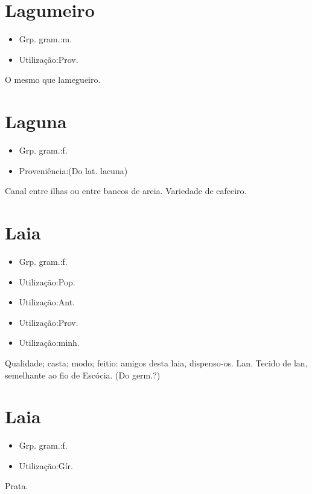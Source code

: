 \section{Lagumeiro}
\begin{itemize}
\item {Grp. gram.:m.}
\end{itemize}
\begin{itemize}
\item {Utilização:Prov.}
\end{itemize}
O mesmo que \textunderscore lamegueiro\textunderscore .
\section{Laguna}
\begin{itemize}
\item {Grp. gram.:f.}
\end{itemize}
\begin{itemize}
\item {Proveniência:(Do lat. \textunderscore lacuna\textunderscore )}
\end{itemize}
Canal entre ilhas ou entre bancos de areia.
Variedade de cafeeiro.
\section{Laia}
\begin{itemize}
\item {Grp. gram.:f.}
\end{itemize}
\begin{itemize}
\item {Utilização:Pop.}
\end{itemize}
\begin{itemize}
\item {Utilização:Ant.}
\end{itemize}
\begin{itemize}
\item {Utilização:Prov.}
\end{itemize}
\begin{itemize}
\item {Utilização:minh.}
\end{itemize}
Qualidade; casta; modo; feitio: \textunderscore amigos desta laia, dispenso-os\textunderscore .
Lan.
Tecido de lan, semelhante ao fio de Escócia.
(Do germ.?)
\section{Laia}
\begin{itemize}
\item {Grp. gram.:f.}
\end{itemize}
\begin{itemize}
\item {Utilização:Gír.}
\end{itemize}
Prata.
